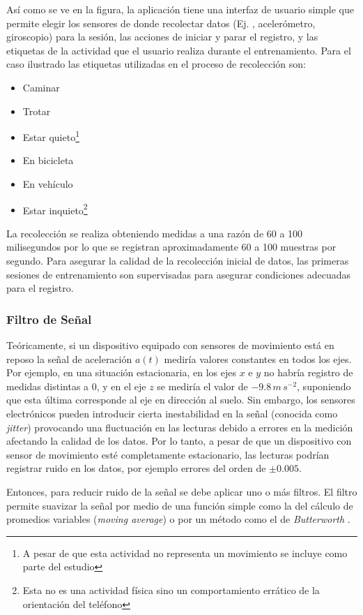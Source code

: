Así como se ve en la figura, la aplicación tiene una interfaz de usuario
simple que permite elegir los sensores de donde recolectar datos (Ej.
, acelerómetro, giroscopio) para la sesión, las acciones
de iniciar y parar el registro, y las etiquetas de la actividad que
el usuario realiza durante el entrenamiento. Para el caso ilustrado
las etiquetas utilizadas en el proceso de recolección son:
\begin{itemize}
\item Caminar
\item Trotar
\item Estar quieto\footnote{A pesar de que esta actividad no representa un movimiento se incluye
como parte del estudio}
\item En bicicleta
\item En vehículo
\item Estar inquieto\footnote{Esta no es una actividad física sino un comportamiento errático de
la orientación del teléfono}
\end{itemize}
La recolección se realiza obteniendo medidas a una razón de 60 a 100
milisegundos por lo que se registran aproximadamente 60 a 100 muestras
por segundo. Para asegurar la calidad de la recolección inicial de
datos, las primeras sesiones de entrenamiento son supervisadas para
asegurar condiciones adecuadas para el registro.

\subsubsection{Filtro de Señal}

\label{ssec44:filtering}Teóricamente, si un dispositivo equipado
con sensores de movimiento está en reposo la señal de aceleración
$a(t)$ mediría valores constantes en todos los ejes. Por ejemplo,
en una situación estacionaria, en los ejes $x$ e $y$ no habría registro
de medidas distintas a $0$, y en el eje $z$ se mediría el valor
de $-9.8\,m\,s^{-2}$, suponiendo que esta última corresponde al eje
en dirección al suelo. Sin embargo, los sensores electrónicos pueden
introducir cierta inestabilidad en la señal (conocida como \emph{jitter})
provocando una fluctuación en las lecturas debido a errores en la
medición afectando la calidad de los datos. Por lo tanto, a pesar
de que un dispositivo con sensor de movimiento esté completamente
estacionario, las lecturas podrían registrar ruido en los datos, por
ejemplo errores del orden de $\pm0.005$. 

Entonces, para reducir ruido de la señal se debe aplicar uno o más
filtros. El filtro permite suavizar la señal por medio de una función
simple como la del cálculo de promedios variables (\emph{moving average})
o por un método como el de \emph{Butterworth} \cite{ReyesOrtiz2015}. 

